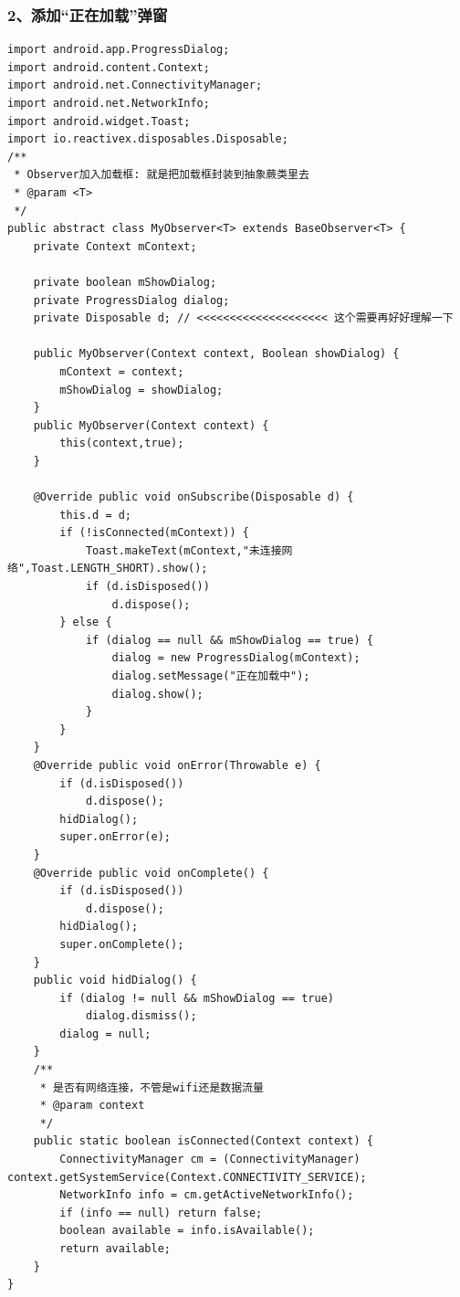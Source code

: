 \documentclass[9pt, b5paper]{article}
\begin{document}
\subsubsection{2、添加“正在加载”弹窗}
\label{sec-18-4-2}
\begin{verbatim}
import android.app.ProgressDialog;
import android.content.Context;
import android.net.ConnectivityManager;
import android.net.NetworkInfo;
import android.widget.Toast;
import io.reactivex.disposables.Disposable;
/**
 * Observer加入加载框: 就是把加载框封装到抽象蕨类里去
 * @param <T>
 */
public abstract class MyObserver<T> extends BaseObserver<T> {
    private Context mContext;

    private boolean mShowDialog;
    private ProgressDialog dialog;
    private Disposable d; // <<<<<<<<<<<<<<<<<<<< 这个需要再好好理解一下

    public MyObserver(Context context, Boolean showDialog) {
        mContext = context;
        mShowDialog = showDialog;
    }
    public MyObserver(Context context) {
        this(context,true);
    }

    @Override public void onSubscribe(Disposable d) {
        this.d = d;
        if (!isConnected(mContext)) {
            Toast.makeText(mContext,"未连接网络",Toast.LENGTH_SHORT).show();
            if (d.isDisposed())
                d.dispose();
        } else {
            if (dialog == null && mShowDialog == true) {
                dialog = new ProgressDialog(mContext);
                dialog.setMessage("正在加载中");
                dialog.show();
            }
        }
    }
    @Override public void onError(Throwable e) {
        if (d.isDisposed()) 
            d.dispose();
        hidDialog();
        super.onError(e);
    }
    @Override public void onComplete() {
        if (d.isDisposed()) 
            d.dispose();
        hidDialog();
        super.onComplete();
    }
    public void hidDialog() {
        if (dialog != null && mShowDialog == true)
            dialog.dismiss();
        dialog = null;
    }
    /**
     * 是否有网络连接，不管是wifi还是数据流量
     * @param context
     */
    public static boolean isConnected(Context context) {
        ConnectivityManager cm = (ConnectivityManager) context.getSystemService(Context.CONNECTIVITY_SERVICE);
        NetworkInfo info = cm.getActiveNetworkInfo();
        if (info == null) return false;
        boolean available = info.isAvailable();
        return available;
    }
}
\end{verbatim}
\end{document}
